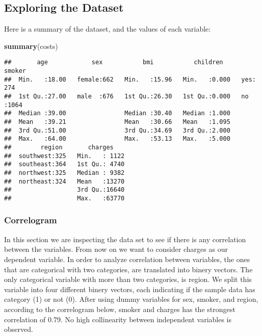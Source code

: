 \documentclass[]{article}
\newenvironment{Shaded}{\begin{snugshade}}{\end{snugshade}}
\newcommand{\KeywordTok}[1]{\textcolor[rgb]{0.13,0.29,0.53}{\textbf{#1}}}
\newcommand{\NormalTok}[1]{#1}
\begin{document}
\hypertarget{exploring-the-dataset}{%
\subsection{Exploring the Dataset}\label{exploring-the-dataset}}

Here is a summary of the dataset, and the values of each variable:

\begin{Shaded}
\begin{Highlighting}[]
\KeywordTok{summary}\NormalTok{(costs)}
\end{Highlighting}
\end{Shaded}

\begin{verbatim}
##       age            sex           bmi           children     smoker    
##  Min.   :18.00   female:662   Min.   :15.96   Min.   :0.000   yes: 274  
##  1st Qu.:27.00   male  :676   1st Qu.:26.30   1st Qu.:0.000   no :1064  
##  Median :39.00                Median :30.40   Median :1.000             
##  Mean   :39.21                Mean   :30.66   Mean   :1.095             
##  3rd Qu.:51.00                3rd Qu.:34.69   3rd Qu.:2.000             
##  Max.   :64.00                Max.   :53.13   Max.   :5.000             
##        region       charges     
##  southwest:325   Min.   : 1122  
##  southeast:364   1st Qu.: 4740  
##  northwest:325   Median : 9382  
##  northeast:324   Mean   :13270  
##                  3rd Qu.:16640  
##                  Max.   :63770
\end{verbatim}

\hypertarget{correlogram}{%
\subsubsection{Correlogram}\label{correlogram}}

In this section we are inspecting the data set to see if there is any
correlation between the variables. From now on we want to consider
charges as our dependent variable. In order to analyze correlation
between variables, the ones that are categorical with two categories,
are translated into binery vectors. The only categorical variable with
more than two categories, is region. We split this variable into four
different binery vectors, each indicating if the sample data has
category (1) or not (0). After using dummy variables for sex, smoker,
and region, according to the correlogram below, smoker and charges has
the strongest correlation of 0.79. No high collinearity between
independent variables is observed.
\end{document}
